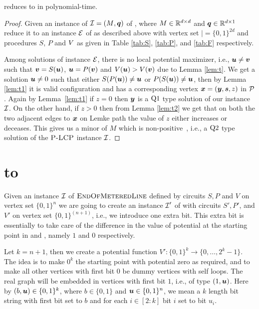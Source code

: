 \begin{theorem}
\PLCP reduces to \EOPL in polynomial-time. 
\end{theorem}
\begin{proof}
	Given an instance of $\mbox{${\mathcal I}$}=(\mbox{$M$},\mbox{\boldmath $q$})$ of \PLCP, where $M\in \mathbb{R}^{d\times d}$ and $\mbox{\boldmath $q$}\in \mathbb{R}^{d\times 1}$ reduce it to an instance $\mbox{${\mathcal E}$}$ of \EOPL as described above with vertex set $\vert=\{0,1\}^{2d}$ and procedures $S$, $P$ and $\mbox{$V$}$ as given in Table \ref{tab:S}, \ref{tab:P}, and \ref{tab:F} respectively.

Among solutions of \EOPL instance $\mbox{${\mathcal E}$}$, there is no local potential maximizer,
	i.e., $\mbox{\boldmath $u$}\neq \mbox{\boldmath $v$}$ such that $\mbox{\boldmath $v$}=S(\mbox{\boldmath $u$})$, $\mbox{\boldmath $u$}=P(\mbox{\boldmath $v$})$ and $\mbox{$V$}(\mbox{\boldmath $u$})>\mbox{$V$}(\mbox{\boldmath $v$})$
	due to Lemma \ref{lem:t}. We get a solution $\mbox{\boldmath $u$} \neq 0$ such that either
	$S(P(\mbox{\boldmath $u$}))\neq \mbox{\boldmath $u$}$ or $P(S(\mbox{\boldmath $u$}))\neq \mbox{\boldmath $u$}$, then by Lemma \ref{lem:t1} it is
	valid configuration and has a corresponding vertex $\mbox{\boldmath $x$}=(\mbox{\boldmath $y$},\mbox{\boldmath $s$},z)$ in
	$\mbox{${\mathcal P}$}$. Again by Lemma~\ref{lem:t1} if $z=0$ then $\mbox{\boldmath $y$}$ is a $\mbox{Q1}$ type solution
	of our \PLCP instance $\mbox{${\mathcal I}$}$. On the other hand, if $z>0$ then from Lemma
	\ref{lem:t2} we get that on both the two adjacent edges to $\mbox{\boldmath $x$}$ on Lemke
	path the value of $z$ either increases or deceases. This gives us a minor of $M$
	which is non-positive~\cite{cottle2009linear}, 
	i.e., a $\mbox{Q2}$ type solution of the $\textsc{P-LCP}$	instance $\mbox{${\mathcal I}$}$.
\end{proof}

\newpage




\newpage
\appendix
\section{\EOML to \EOPL}
\label{sec:EOMLtoEOPL}

Given an instance $\mbox{${\mathcal I}$}$ of $\textsc{EndOfMeteredLine}$ defined by circuits $S,P$ and $V$ on vertex
set $\{0,1\}^n$ we are going to create an instance $\mbox{${\mathcal I}$}'$ of \EOPL with circuits
$S',P'$, and $V'$ on vertex set $\{0,1\}^{(n+1)}$, i.e., we introduce one extra bit.  
This extra bit is essentially to take care of the difference in the value of potential 
at the starting point in \EOML and \EOPL, namely $1$ and $0$ respectively. 

Let $k=n+1$, then we create a potential function $V':\{0,1\}^k \rightarrow
\{0,\dots,2^k-1\}$. 
The idea is to make $0^k$ the starting point with potential zero as required,
and to make all other vertices with first bit $0$ be dummy vertices with self
loops. The real graph
will be embedded in vertices with first bit $1$, i.e., of type $(1,\mbox{\boldmath $u$})$. Here
by $(b,\mbox{\boldmath $u$})\in \{0,1\}^k$, where $b\in \{0,1\}$ and $\mbox{\boldmath $u$}\in \{0,1\}^n$, we mean
a $k$ length bit string with first bit set to $b$ and for each $i\in[2:k]$ bit $i$ 
set to bit $u_i$. %

